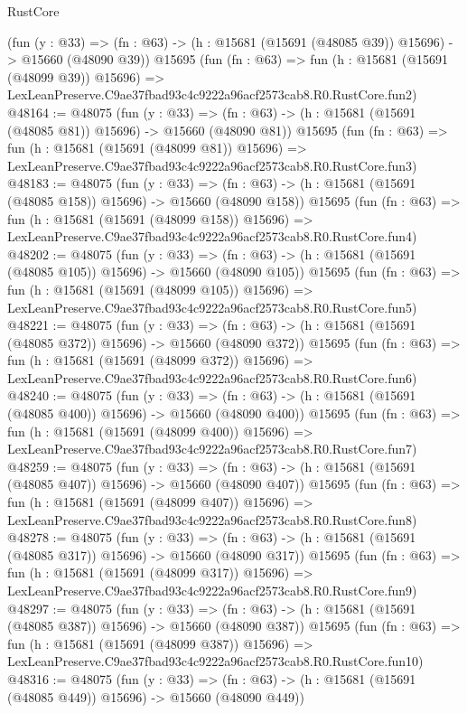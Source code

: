 \begin{lexlean}{RustCore}
\begin{coremodule}
    (fun (y : @33) =>
    (fn : @63) -> (h : @15681 (@15691 (@48085 @39)) @15696) -> @15660 (@48090 @39))
    @15695
    (fun (fn : @63) =>
    fun (h : @15681 (@15691 (@48099 @39)) @15696) =>
    LexLeanPreserve.C9ae37fbad93c4c9222a96acf2573cab8.R0.RustCore.fun2)
@48164 := @48075
    (fun (y : @33) =>
    (fn : @63) -> (h : @15681 (@15691 (@48085 @81)) @15696) -> @15660 (@48090 @81))
    @15695
    (fun (fn : @63) =>
    fun (h : @15681 (@15691 (@48099 @81)) @15696) =>
    LexLeanPreserve.C9ae37fbad93c4c9222a96acf2573cab8.R0.RustCore.fun3)
@48183 := @48075
    (fun (y : @33) =>
    (fn : @63) -> (h : @15681 (@15691 (@48085 @158)) @15696) -> @15660 (@48090 @158))
    @15695
    (fun (fn : @63) =>
    fun (h : @15681 (@15691 (@48099 @158)) @15696) =>
    LexLeanPreserve.C9ae37fbad93c4c9222a96acf2573cab8.R0.RustCore.fun4)
@48202 := @48075
    (fun (y : @33) =>
    (fn : @63) -> (h : @15681 (@15691 (@48085 @105)) @15696) -> @15660 (@48090 @105))
    @15695
    (fun (fn : @63) =>
    fun (h : @15681 (@15691 (@48099 @105)) @15696) =>
    LexLeanPreserve.C9ae37fbad93c4c9222a96acf2573cab8.R0.RustCore.fun5)
@48221 := @48075
    (fun (y : @33) =>
    (fn : @63) -> (h : @15681 (@15691 (@48085 @372)) @15696) -> @15660 (@48090 @372))
    @15695
    (fun (fn : @63) =>
    fun (h : @15681 (@15691 (@48099 @372)) @15696) =>
    LexLeanPreserve.C9ae37fbad93c4c9222a96acf2573cab8.R0.RustCore.fun6)
@48240 := @48075
    (fun (y : @33) =>
    (fn : @63) -> (h : @15681 (@15691 (@48085 @400)) @15696) -> @15660 (@48090 @400))
    @15695
    (fun (fn : @63) =>
    fun (h : @15681 (@15691 (@48099 @400)) @15696) =>
    LexLeanPreserve.C9ae37fbad93c4c9222a96acf2573cab8.R0.RustCore.fun7)
@48259 := @48075
    (fun (y : @33) =>
    (fn : @63) -> (h : @15681 (@15691 (@48085 @407)) @15696) -> @15660 (@48090 @407))
    @15695
    (fun (fn : @63) =>
    fun (h : @15681 (@15691 (@48099 @407)) @15696) =>
    LexLeanPreserve.C9ae37fbad93c4c9222a96acf2573cab8.R0.RustCore.fun8)
@48278 := @48075
    (fun (y : @33) =>
    (fn : @63) -> (h : @15681 (@15691 (@48085 @317)) @15696) -> @15660 (@48090 @317))
    @15695
    (fun (fn : @63) =>
    fun (h : @15681 (@15691 (@48099 @317)) @15696) =>
    LexLeanPreserve.C9ae37fbad93c4c9222a96acf2573cab8.R0.RustCore.fun9)
@48297 := @48075
    (fun (y : @33) =>
    (fn : @63) -> (h : @15681 (@15691 (@48085 @387)) @15696) -> @15660 (@48090 @387))
    @15695
    (fun (fn : @63) =>
    fun (h : @15681 (@15691 (@48099 @387)) @15696) =>
    LexLeanPreserve.C9ae37fbad93c4c9222a96acf2573cab8.R0.RustCore.fun10)
@48316 := @48075
    (fun (y : @33) =>
    (fn : @63) -> (h : @15681 (@15691 (@48085 @449)) @15696) -> @15660 (@48090 @449))

\end{coremodule}
\end{lexlean}
